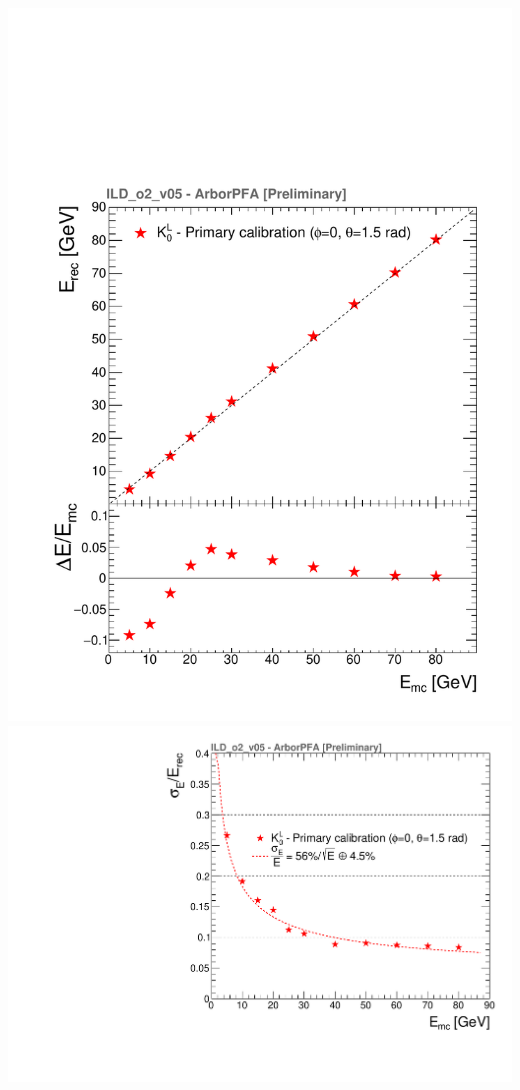 \documentclass[8pt]{beamer}
\begin{document}
\begin{frame}
\begin{minipage}{0.6\linewidth}
\begin{center}
      \end{center}
    \end{minipage} \hfill
    \begin{minipage}{0.39\linewidth}
      \begin{center}
        \includegraphics[width=0.8\linewidth]{kaon0L_primary_calibration_erec_2.pdf} \\
        \includegraphics[width=0.8\linewidth]{kaon0L_primary_calibration_eresol_2.pdf}
      \end{center}
    \end{minipage}
  \end{frame}
\end{document}
